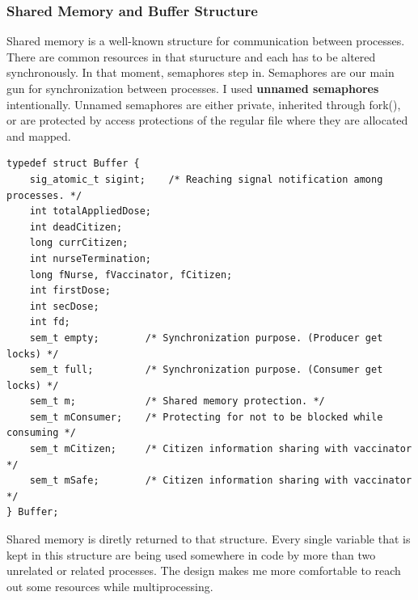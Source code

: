 \documentclass{article}
\begin{document}
\subsubsection{Shared Memory and Buffer Structure}
Shared memory is a well-known structure for communication between processes. There are common resources in that sturucture and each has to be altered synchronously. In that moment, semaphores step in. Semaphores are our main gun for synchronization between processes. I used \textbf{unnamed semaphores} intentionally. Unnamed semaphores are either private, inherited through fork(), or are protected by access protections of the regular file where they are allocated and mapped.
\begin{lstlisting}[style=CStyle]
typedef struct Buffer {
    sig_atomic_t sigint;    /* Reaching signal notification among processes. */
    int totalAppliedDose;
    int deadCitizen;
    long currCitizen;
    int nurseTermination;
    long fNurse, fVaccinator, fCitizen;
    int firstDose;
    int secDose;
    int fd;
    sem_t empty;        /* Synchronization purpose. (Producer get locks) */
    sem_t full;         /* Synchronization purpose. (Consumer get locks) */
    sem_t m;            /* Shared memory protection. */
    sem_t mConsumer;    /* Protecting for not to be blocked while consuming */
    sem_t mCitizen;     /* Citizen information sharing with vaccinator */
    sem_t mSafe;        /* Citizen information sharing with vaccinator */
} Buffer;
\end{lstlisting}
Shared memory is diretly returned to that structure. Every single variable that is kept in this structure are being used somewhere in code by more than two unrelated or related processes. The design makes me more comfortable to reach out some resources while multiprocessing.
\end{document}

